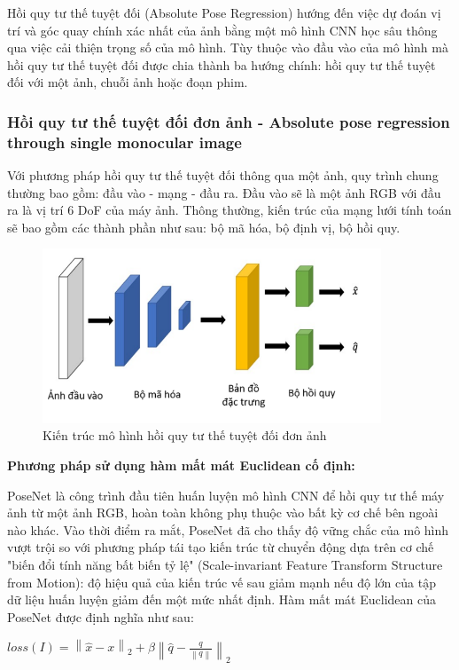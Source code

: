 Hồi quy tư thế tuyệt đối (Absolute Pose Regression) hướng đến việc dự đoán vị trí và góc quay chính xác nhất của ảnh bằng một mô hình CNN học sâu thông qua việc cải thiện trọng số của mô hình. Tùy thuộc vào đầu vào của mô hình mà hồi quy tư thế tuyệt đối được chia thành ba hướng chính: hồi quy tư thế tuyệt đối với một ảnh, chuỗi ảnh hoặc đoạn phim.

\subsubsection*{Hồi quy tư thế tuyệt đối đơn ảnh - Absolute pose regression through single monocular image}
Với phương pháp hồi quy tư thế tuyệt đối thông qua một ảnh, quy trình chung thường bao gồm: đầu vào - mạng - đầu ra. Đầu vào sẽ là một ảnh RGB với đầu ra là vị trí 6 DoF của máy ảnh. Thông thường, kiến trúc của mạng lưới tính toán sẽ bao gồm các thành phần như sau: bộ mã hóa, bộ định vị, bộ hồi quy.

\begin{figure}[H]
    \centering
    \includegraphics[width=0.9\textwidth]{pics/Chapter2/kientruc_APR_1.png}
    \caption{Kiến trúc mô hình hồi quy tư thế tuyệt đối đơn ảnh \cite{kendall2016posenet}}
\end{figure}

\noindent\textbf{Phương pháp sử dụng hàm mất mát Euclidean cố định:}

PoseNet \cite{kendall2016posenet} là công trình đầu tiên huấn luyện mô hình CNN để hồi quy tư thế máy ảnh từ một ảnh RGB, hoàn toàn không phụ thuộc vào bất kỳ cơ chế bên ngoài nào khác. Vào thời điểm ra mắt, PoseNet đã cho thấy độ vững chắc của mô hình vượt trội so với phương pháp tái tạo kiến trúc từ chuyển động dựa trên cơ chế "biến đổi tính năng bất biến tỷ lệ" (Scale-invariant Feature Transform Structure from Motion): độ hiệu quả của kiến trúc vế sau giảm mạnh nếu độ lớn của tập dữ liệu huấn luyện giảm đến một mức nhất định. Hàm mất mát Euclidean của PoseNet được định nghĩa như sau:
\begin{center}
    $loss(I) = \left \| \hat{x} - x \right \|_2 + \beta \left \| \hat{q} - \frac{q}{\left \| q \right \|} \right \|_2$
\end{center}

